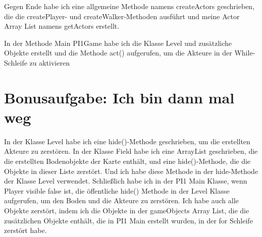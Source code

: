 \documentclass{pi1}
\begin{document}


Gegen Ende habe ich eine allgemeine Methode namens createActors geschrieben, die die createPlayer- und createWalker-Methoden ausführt und meine Actor Array List namens getActors erstellt.







In der Methode Main PI1Game habe ich die Klasse Level und zusätzliche Objekte erstellt und die Methode act() aufgerufen, um die Akteure in der While-Schleife zu aktivieren



\section{Bonusaufgabe: Ich bin dann mal weg}

In der Klasse Level habe ich eine hide()-Methode geschrieben, um die erstellten Akteure zu zerstören. In der Klasse Field habe ich eine ArrayList geschrieben, die die erstellten Bodenobjekte der Karte enthält, und eine hide()-Methode, die die Objekte in dieser Liste zerstört. Und ich habe diese Methode in der hide-Methode der Klasse Level verwendet. Schließlich habe ich in der PI1 Main Klasse, wenn Player visible false ist, die öffentliche hide() Methode in der Level Klasse aufgerufen, um den Boden und die Akteure zu zerstören. Ich habe auch alle Objekte zerstört, indem ich die Objekte in der gameObjects Array List, die die zusätzlichen Objekte enthält, die in PI1 Main erstellt wurden, in der for Schleife zerstört habe.



 
 
 
 

\end{document}
